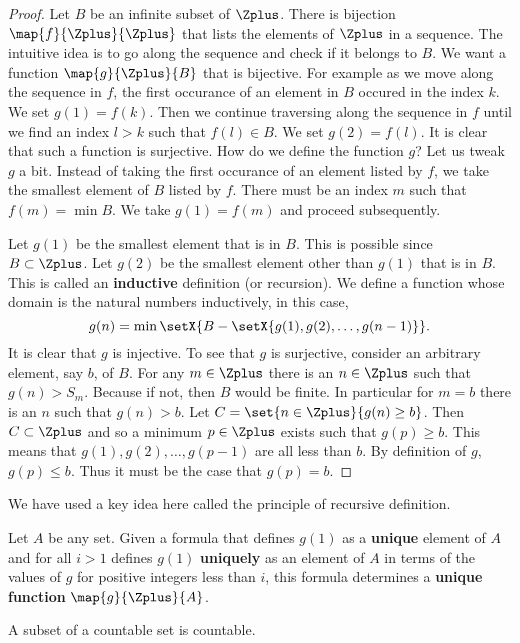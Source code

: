 \begin{proof}
    Let $B$ be an infinite subset of $\Zplus$. 
    There is bijection $\map{f}{\Zplus}{\Zplus}$ that lists the elements of $\Zplus$ in a sequence. 
    The intuitive idea is to go along the sequence and check if it belongs to $B$. 
    We want a function $\map{g}{\Zplus}{B}$ that is bijective. 
    For example as we move along the sequence in $f$, the first occurance of an element in $B$ occured in the
    index $k$. We set $g(1) = f(k)$. Then we continue traversing along the sequence in $f$ until we find an index
    $l > k$ such that $f(l) \in B$. We set $g(2) = f(l)$. It is clear that such a function is surjective. 
    How do we define the function $g$? Let us tweak $g$ a bit. Instead of taking the first occurance
    of an element listed by $f$, we take the smallest element of $B$ listed by $f$. There must be an index $m$
    such that $f(m) = \min{B}$. We take $g(1) = f(m)$ and proceed subsequently. 

    Let $g(1)$ be the smallest element that is in
    $B$. This is possible since $B \subset \Zplus$. Let $g(2)$ be the smallest element other than $g(1)$ that
    is in $B$. This is called an \textbf{inductive} definition (or recursion). We define a function whose
    domain is the natural numbers inductively, in this case,
    \[g(n) = \min\setX{B-\setX{g(1),g(2),\ldots,g(n-1)}}.\]
    It is clear that $g$ is injective. To see that $g$ is surjective, consider an arbitrary element, say $b$, 
    of $B$. For any $m \in \Zplus$ there is an $n \in \Zplus$ such that $g(n) > S_m$. Because if not, then $B$
    would be finite. In particular for $m = b$ there is an $n$ such that $g(n) > b$. Let $C =
    \set{n\in\Zplus}{g(n)\geq b}$. Then $C \subset \Zplus$ and so a minimum $p \in \Zplus$ exists such that
    $g(p) \geq b$. This means that $g(1),g(2),\ldots,g(p-1)$ are all less than $b$. By definition of $g$,
    $g(p)\leq b$. Thus it must be the case that $g(p) = b$.
\end{proof}
We have used a key idea here called the principle of recursive definition.
\begin{Definition}[name=Principle of recursive definition]
    Let $A$ be any set. Given a formula that defines $g(1)$ as a \textbf{unique} element of $A$ and for all
    $i > 1$ defines $g(1)$ \textbf{uniquely} as an element of $A$ in terms of the values of $g$ for positive
    integers less than $i$, this formula determines a \textbf{unique function} $\map{g}{\Zplus}{A}$.
\end{Definition}
\begin{Corollary}
    A subset of a countable set is countable.
\end{Corollary}
